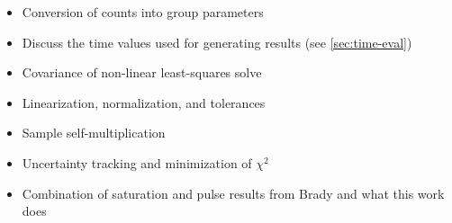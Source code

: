 \begin{itemize}
    \item Conversion of counts into group parameters
    \item Discuss the time values used for generating results (see \ref{sec:time-eval})
    \item Covariance of non-linear least-squares solve
    \item Linearization, normalization, and tolerances
    \item Sample self-multiplication
    \item Uncertainty tracking and minimization of $\chi^2$
    \item Combination of saturation and pulse results from Brady \cite{brady1988evaluation} and what this work does
\end{itemize}
